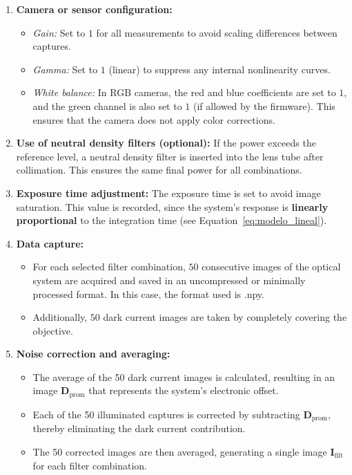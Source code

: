 \begin{enumerate}
    \item \textbf{Camera or sensor configuration:}
    \begin{itemize}
        \item \emph{Gain:} Set to $1$ for all measurements to avoid scaling differences between captures.
        \item \emph{Gamma:} Set to $1$ (linear) to suppress any internal nonlinearity curves.
        \item \emph{White balance:} In RGB cameras, the red and blue coefficients are set to $1$, and the green channel is also set to $1$ (if allowed by the firmware). This ensures that the camera does not apply color corrections.
    \end{itemize}
    
    \item \textbf{Use of neutral density filters (optional):} If the power exceeds the reference level, a neutral density filter is inserted into the lens tube after collimation. This ensures the same final power for all combinations.
    
    \item \textbf{Exposure time adjustment:} The exposure time is set to avoid image saturation. This value is recorded, since the system's response is \textbf{linearly proportional} to the integration time (see Equation~\ref{eq:modelo_lineal}).
    
    \item \textbf{Data capture:}
    \begin{itemize}
        \item For each selected filter combination, $50$ consecutive images of the optical system are acquired and saved in an uncompressed or minimally processed format. In this case, the format used is .npy.
        \item Additionally, $50$ dark current images are taken by completely covering the objective.
    \end{itemize}
    
    \item \textbf{Noise correction and averaging:}
    \begin{itemize}
        \item The average of the 50 dark current images is calculated, resulting in an image \(\mathbf{D}_{\text{prom}}\) that represents the system’s electronic offset.
        \item Each of the 50 illuminated captures is corrected by subtracting \(\mathbf{D}_{\text{prom}}\), thereby eliminating the dark current contribution.
        \item The 50 corrected images are then averaged, generating a single image \(\mathbf{I}_{\text{filt}}\) for each filter combination.
    \end{itemize}
    

\end{enumerate}
